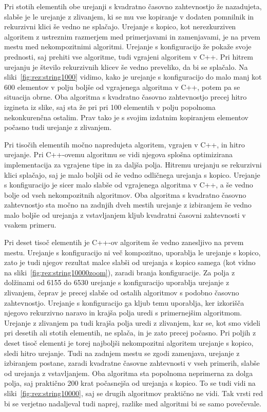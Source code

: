 \documentclass[a4paper,oneside,12pt]{article}
\begin{document}
Pri stotih elementih obe urejanji s kvadratno časovno zahtevnostjo že nazadujeta, slabše je le urejanje z zlivanjem,
ki se mu vse kopiranje v dodaten pomnilnik in rekurzivni klici 
še vedno ne splačajo. Urejanje s kopico, kot nerezkurziven algoritem
z ustreznim razmerjem med primerjavami in zamenjavami, je na prvem mestu med nekompozitnimi algoritmi.
Urejanje s konfiguracijo že pokaže svoje prednosti, saj prehiti vse algoritme, tudi vgrajeni 
algoritem v C++. Pri hitrem urejanju je število rekurzivnih klicev še vedno preveliko, da bi se splačalo.
Na sliki~\ref{fig:rez:string1000} vidimo, kako je urejanje s konfiguracijo do
malo manj kot 600 elementov v polju boljše od vgrajenega algoritma v C++, potem
pa se situacija obrne. Oba algoritma s kvadratno časovno zahtevnostjo precej
hitro izgineta iz slike, saj sta že pri pri 100 elementih v polju popolnoma
nekonkurenčna ostalim. Prav tako je s svojim izdatnim kopiranjem elementov
počasno tudi urejanje z zlivanjem.

Pri tisočih elementih močno napredujeta algoritem, vgrajen v C++, in hitro urejanje. Pri C++-ovemu algoritmu
se vidi njegova splošna optimizirana implementacija za vgrajene tipe in za daljša polja. Hitremu urejanju se 
rekurzivni klici splačajo, saj je malo boljši od še vedno odličnega urejanja s kopico. Urejanje s konfiguracijo 
je sicer malo slabše od vgrajenega algoritma v C++, a še vedno bolje od vseh nekompozitnih algoritmov.
Oba algoritma s kvadratno časovno zahtevnostjo sta močno na zadnjih dveh mestih urejanje z izbiranjem 
še vedno malo boljše od urejanja z vstavljanjem kljub kvadratni časovni zahtevnosti v vsakem primeru.

Pri deset tisoč elementih je C++-ov algoritem še vedno zanesljivo na prvem mestu. Urejanje s 
konfiguracijo ni več kompozitno, uporablja le urejanje s kopico, zato je tudi
njegov rezultat malce slabši od urejanja s kopico samega (kot vidno na
sliki~\ref{fig:rez:string10000zoom}), zaradi branja
konfiguracije. Za polja z dolžinami od 6155 do 6530 urejanje s konfiguracijo uporablja
urejanje z zlivanjem, čeprav je precej slabše od ostalih algoritmov s podobno časovno zahtevnostjo. Urejanje s
konfiguracijo ga kljub temu uporablja, ker izkorišča njegovo rekurzivno naravo in krajša polja uredi s
primernejšim algoritmom. Urejanje z zlivanjem pa tudi krajša polja uredi z zlivanjem, kar se, kot smo 
videli pri desetih ali stotih elementih, ne splača, in je zato precej počasno.
Pri poljih z deset tisoč elementi je torej najboljši nekompozitni algoritem 
urejanje s kopico, sledi hitro urejanje. Tudi na zadnjem mestu se zgodi zamenjava, urejanje z izbiranjem
postane, zaradi kvadratne časovne zahtevnosti v vseh primerih, slabše od %
urejanja z vstavljanjem. Oba algoritma sta popolnoma neprimerna za dolga polja,
saj praktično 200 krat počasnejša od urejanja s kopico. To se tudi vidi na
sliki~\ref{fig:rez:string10000}, saj se drugih algoritmov praktično ne vidi.
Tak vrsti red bi se verjetno nadaljeval tudi naprej, razlike med algoritmi bi se
samo povečevale.
\end{document}
